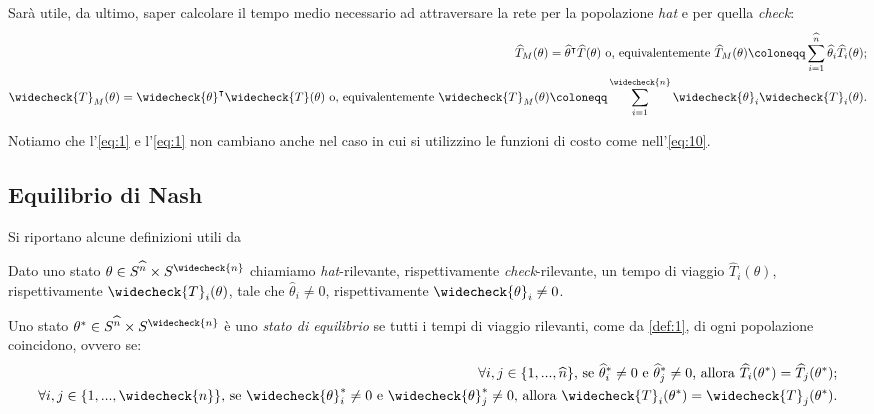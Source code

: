 Sarà utile, da ultimo, saper calcolare il tempo medio necessario ad attraversare la rete per la popolazione \textit{hat}
e per quella \textit{check}:
\begin{equation}
    \begin{split}
    \widehat{T}_M(\theta)=\widehat{\theta}^{\intercal}\widehat{T}(\theta)
    \text{ o, equivalentemente }
    \widehat{T}_M(\theta)\coloneqq\sum_{i=1}^{\widehat{n}}\widehat{\theta}_i\widehat{T}_i(\theta);\\
    \widecheck{T}_M(\theta)=\widecheck{\theta}^{\intercal}\widecheck{T}(\theta)
    \text{ o, equivalentemente }
    \widecheck{T}_M(\theta)\coloneqq\sum_{i=1}^{\widecheck{n}}\widecheck{\theta}_i\widecheck{T}_i(\theta).
    \end{split}
    \label{eq:3}
\end{equation}

Notiamo che l'\autoref{eq:1} e l'\autoref{eq:1} non cambiano anche nel caso in cui si utilizzino le funzioni di costo 
come nell'\autoref{eq:10}.

\subsection{Equilibrio di Nash}
\label{subsec:EqNash}

Si riportano alcune definizioni utili da \cite[Cap. 2]{MR4911797}
\begin{definition}\label{def:1}
    Dato uno stato $\theta\in S^{\widehat{n}}\times S^{\widecheck{n}}$ chiamiamo \textit{hat}-rilevante, rispettivamente
    \textit{check}-rilevante, un tempo di viaggio $\widehat{T}_i(\theta)$, rispettivamente $\widecheck{T}_i(\theta)$, tale 
    che $\widehat{\theta}_i\neq 0$, rispettivamente $\widecheck{\theta}_i\neq 0$.
\end{definition}

\begin{definition}\label{def:2}
    Uno stato $\theta^{*}\in S^{\widehat{n}}\times S^{\widecheck{n}}$ è uno \textit{stato di equilibrio}
    se tutti i tempi di viaggio rilevanti, come da \autoref{def:1}, di ogni popolazione coincidono, ovvero se:
    \begin{equation*}
        \begin{split}
        \forall i,j\in\{1,...,\widehat{n}\} \text{, se }\widehat{\theta}_i^{*}\neq 0 \text{ e }\widehat{\theta}_j^{*}\neq 0
        \text{, allora }\widehat{T}_i(\theta^{*})=\widehat{T}_j(\theta^{*});\\
        \forall i,j\in\{1,...,\widecheck{n}\} \text{, se }\widecheck{\theta}_i^{*}\neq 0 \text{ e }\widecheck{\theta}_j^{*}\neq 0
        \text{, allora }\widecheck{T}_i(\theta^{*})=\widecheck{T}_j(\theta^{*}).
        \end{split}
    \end{equation*}
\end{definition}

